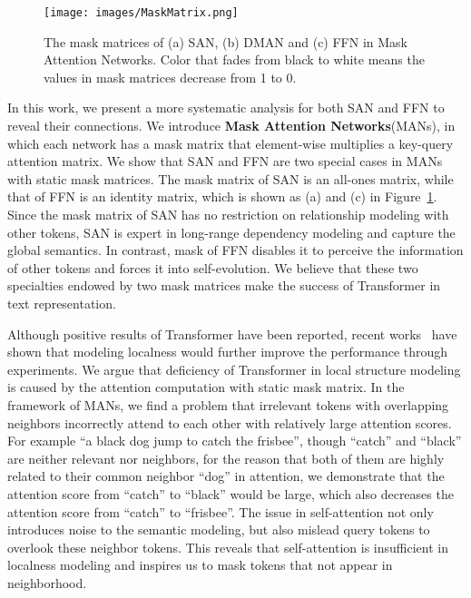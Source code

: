 \documentclass[11pt]{article}
\begin{document}
\begin{figure}[t]
    \centering
    \texttt{[image: images/MaskMatrix.png]}
	\caption{The mask matrices of (a) SAN, (b) DMAN and (c) FFN in Mask Attention Networks. Color that fades from black to white means the values in mask matrices decrease from 1 to 0.}\label{mask.matrix}
\end{figure}



In this work, we present a more systematic analysis for both SAN and FFN to reveal their connections. We introduce \textbf{Mask Attention Networks}(MANs), in which each network has a mask matrix that element-wise multiplies a key-query attention matrix. We show that SAN and FFN are two special cases in MANs with static mask matrices. The mask matrix of SAN is an all-ones matrix, while that of FFN is an identity matrix, which is shown as (a) and (c) in Figure~\ref{mask.matrix}. Since the mask matrix of SAN has no restriction on relationship modeling with other tokens, SAN is expert in long-range dependency modeling and capture the global semantics. In contrast, mask of FFN disables it to perceive the information of other tokens and forces it into self-evolution. We believe that these two specialties endowed by two mask matrices make the success of Transformer in text representation. 

Although positive results of Transformer have been reported, recent works~\cite{shaw2018self,yang2018modeling,guo2019gaussian} have shown that modeling localness would further improve the performance through experiments. We argue that deficiency of Transformer in local structure modeling is caused by the attention computation with static mask matrix. 
In the framework of MANs, we find a problem that irrelevant tokens with overlapping neighbors incorrectly attend to each other with relatively large attention scores. For example ``a black dog jump to catch the frisbee'', though ``catch'' and ``black'' are neither relevant nor neighbors, for the reason that both of them are highly related to their common neighbor ``dog'' in attention, we demonstrate that the attention score from ``catch'' to ``black'' would be large, which also decreases the attention score from ``catch'' to ``frisbee''. The issue in self-attention not only introduces noise to the semantic modeling, but also mislead query tokens to overlook these neighbor tokens. This reveals that self-attention is insufficient in localness modeling and inspires us to mask tokens that not appear in neighborhood. 
\end{document}
